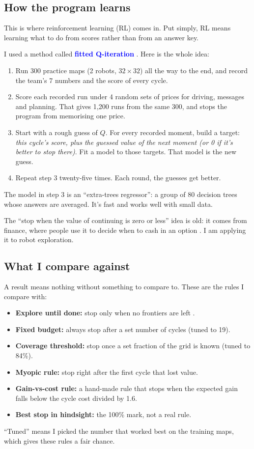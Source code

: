 \documentclass[11pt,a4paper]{article}
\newcommand{\key}[1]{\textcolor{blue}{\textbf{#1}}}
\begin{document}
\subsection{How the program learns}

This is where reinforcement learning (RL) comes in. Put simply, RL means learning what to do from scores rather than from an answer key.

I used a method called \key{fitted Q-iteration} \cite{ernst2005}. Here is the whole idea:
\begin{enumerate}
  \item Run 300 practice maps (2 robots, $32\times32$) all the way to the end, and record the team's 7 numbers and the score of every cycle.
  \item Score each recorded run under 4 random sets of prices for driving, messages and planning. That gives 1,200 runs from the same 300, and stops the program from memorising one price.
  \item Start with a rough guess of $Q$. For every recorded moment, build a target: \emph{this cycle's score, plus the guessed value of the next moment (or 0 if it's better to stop there)}. Fit a model to those targets. That model is the new guess.
  \item Repeat step 3 twenty-five times. Each round, the guesses get better.
\end{enumerate}
The model in step 3 is an ``extra-trees regressor'': a group of 80 decision trees whose answers are averaged. It's fast and works well with small data.

The ``stop when the value of continuing is zero or less'' idea is old: it comes from finance, where people use it to decide when to cash in an option \cite{longstaff2001,tsitsiklis1999}. I am applying it to robot exploration.

\subsection{What I compare against}

A result means nothing without something to compare to. These are the rules I compare with:
\begin{itemize}
  \item \textbf{Explore until done:} stop only when no frontiers are left \cite{yamauchi1997,burgard2005}.
  \item \textbf{Fixed budget:} always stop after a set number of cycles (tuned to 19).
  \item \textbf{Coverage threshold:} stop once a set fraction of the grid is known (tuned to 84\%).
  \item \textbf{Myopic rule:} stop right after the first cycle that lost value.
  \item \textbf{Gain-vs-cost rule:} a hand-made rule that stops when the expected gain falls below the cycle cost divided by 1.6.
  \item \textbf{Best stop in hindsight:} the 100\% mark, not a real rule.
\end{itemize}
``Tuned'' means I picked the number that worked best on the training maps, which gives these rules a fair chance.
\end{document}
